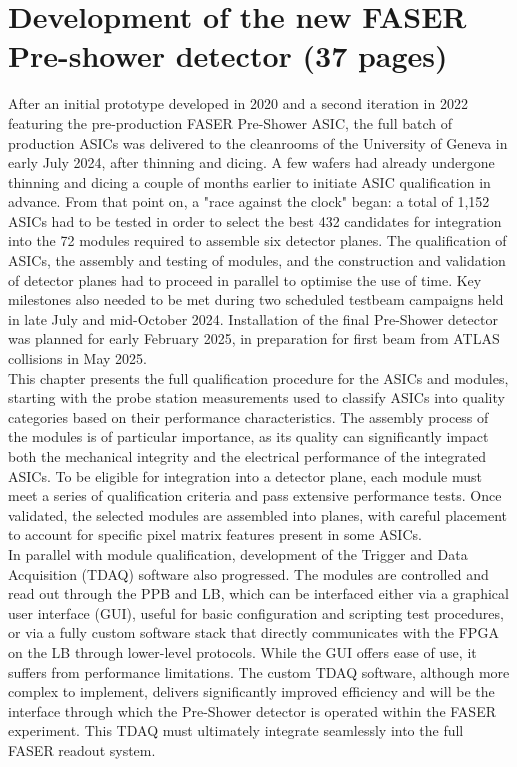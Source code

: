 \chapter{Development of the new FASER Pre-shower detector (37 pages)}
	
After an initial prototype developed in 2020 and a second iteration in 2022 featuring the pre-production FASER Pre-Shower ASIC, the full batch of production ASICs was delivered to the cleanrooms of the University of Geneva in early July 2024, after thinning and dicing. A few wafers had already undergone thinning and dicing a couple of months earlier to initiate ASIC qualification in advance. From that point on, a "race against the clock" began: a total of 1,152 ASICs had to be tested in order to select the best 432 candidates for integration into the 72 modules required to assemble six detector planes. The qualification of ASICs, the assembly and testing of modules, and the construction and validation of detector planes had to proceed in parallel to optimise the use of time. Key milestones also needed to be met during two scheduled testbeam campaigns held in late July and mid-October 2024. Installation of the final Pre-Shower detector was planned for early February 2025, in preparation for first beam from ATLAS collisions in May 2025.\\

This chapter presents the full qualification procedure for the ASICs and modules, starting with the probe station measurements used to classify ASICs into quality categories based on their performance characteristics. The assembly process of the modules is of particular importance, as its quality can significantly impact both the mechanical integrity and the electrical performance of the integrated ASICs. To be eligible for integration into a detector plane, each module must meet a series of qualification criteria and pass extensive performance tests. Once validated, the selected modules are assembled into planes, with careful placement to account for specific pixel matrix features present in some ASICs. \\

In parallel with module qualification, development of the Trigger and Data Acquisition (TDAQ) software also progressed. The modules are controlled and read out through the PPB and LB, which can be interfaced either via a graphical user interface (GUI), useful for basic configuration and scripting test procedures, or via a fully custom software stack that directly communicates with the FPGA on the LB through lower-level protocols. While the GUI offers ease of use, it suffers from performance limitations. The custom TDAQ software, although more complex to implement, delivers significantly improved efficiency and will be the interface through which the Pre-Shower detector is operated within the FASER experiment. This TDAQ must ultimately integrate seamlessly into the full FASER readout system. \\

